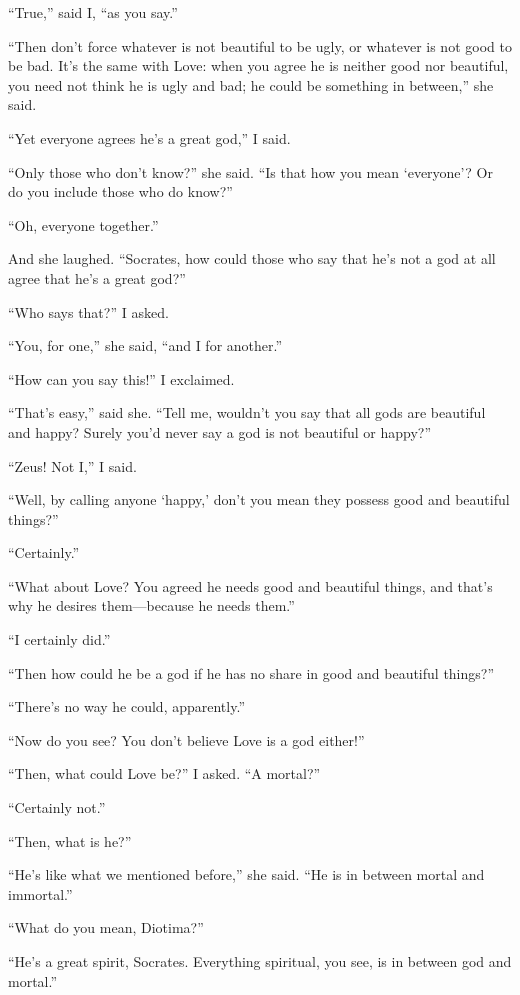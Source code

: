 “True,” said I, “as you say.” 

“Then don't force whatever is not beautiful to be ugly, or whatever is
not good to be bad. It's the same with Love: when you agree he is
neither good nor beautiful, you need not think he is ugly and bad; he
could be something in between,” she said.

“Yet everyone agrees he's a great god,” I said.

“Only those who don't know?” she said. “Is that how you mean ‘everyone'?
Or do you include those who do know?”

“Oh, everyone together.”

And she laughed. “Socrates, how could those who say that he's not a
 god at all agree that he's a great god?”

“Who says that?” I asked.

“You, for one,” she said, “and I for another.”

“How can you say this!” I exclaimed.

“That's easy,” said she. “Tell me, wouldn't you say that all gods are
beautiful and happy? Surely you'd never say a god is not beautiful or
happy?”

“Zeus! Not I,” I said.

“Well, by calling anyone ‘happy,' don't you mean they possess good and
beautiful things?”

“Certainly.” 

“What about Love? You agreed he needs good and beautiful things, and
that's why he desires them---because he needs them.”

“I certainly did.”

“Then how could he be a god if he has no share in good and beautiful
things?”

“There's no way he could, apparently.”

“Now do you see? You don't believe Love is a god either!”

“Then, what could Love be?” I asked. “A mortal?”

“Certainly not.”

“Then, what is he?”

“He's like what we mentioned before,” she said. “He is in between mortal
and immortal.”

“What do you mean, Diotima?”

“He's a great spirit, Socrates. Everything spiritual, you see, is in
between  god and mortal.”

